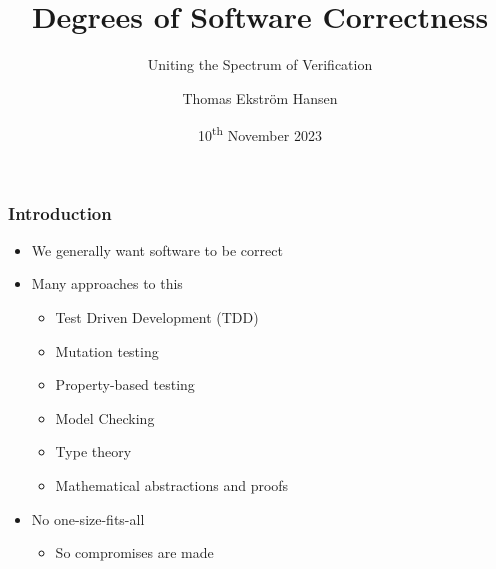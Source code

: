\documentclass[compress,handout]{beamer}
\title{Degrees of Software Correctness}
\subtitle{Uniting the Spectrum of Verification}
\author{Thomas Ekstr{\" o}m Hansen}
\date{10\textsuperscript{th} November 2023}
\begin{document}
\maketitle


\begin{frame}
  \frametitle{Introduction}

  \begin{itemize}
    \item<1-> We generally want software to be correct
    \item<1-> Many approaches to this
      \begin{itemize}
        \item<2-> Test Driven Development (TDD)
        \item<3-> Mutation testing
        \item<4-> Property-based testing
        \item<5-> Model Checking
        \item<6-> Type theory
        \item<7-> Mathematical abstractions and proofs
      \end{itemize}
    \item<8-> No one-size-fits-all
      \begin{itemize}
        \item<9-> So compromises are made
      \end{itemize}
  \end{itemize}

\end{frame}
\end{document}

